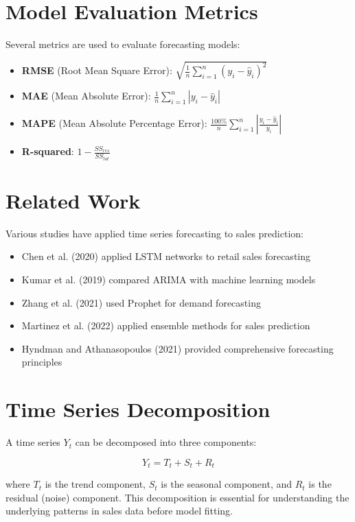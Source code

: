 \documentclass[12pt,a4paper]{report}
\begin{document}
\section{Model Evaluation Metrics}
\label{sec:metrics}
Several metrics are used to evaluate forecasting models:

\begin{itemize}
    \item \textbf{RMSE} (Root Mean Square Error): $\sqrt{\frac{1}{n}\sum_{i=1}^{n}(y_i - \hat{y}_i)^2}$
    \item \textbf{MAE} (Mean Absolute Error): $\frac{1}{n}\sum_{i=1}^{n}|y_i - \hat{y}_i|$
    \item \textbf{MAPE} (Mean Absolute Percentage Error): $\frac{100\%}{n}\sum_{i=1}^{n}|\frac{y_i - \hat{y}_i}{y_i}|$
    \item \textbf{R-squared}: $1 - \frac{SS_{res}}{SS_{tot}}$
\end{itemize}

\section{Related Work}
\label{sec:related}
Various studies have applied time series forecasting to sales prediction:

\begin{itemize}
    \item Chen et al. (2020) applied LSTM networks to retail sales forecasting
    \item Kumar et al. (2019) compared ARIMA with machine learning models
    \item Zhang et al. (2021) used Prophet for demand forecasting
    \item Martinez et al. (2022) applied ensemble methods for sales prediction
    \item Hyndman and Athanasopoulos (2021) provided comprehensive forecasting principles
\end{itemize}

\section{Time Series Decomposition}
\label{sec:decomposition}
A time series $Y_t$ can be decomposed into three components:

\begin{equation}
Y_t = T_t + S_t + R_t
\end{equation}

where $T_t$ is the trend component, $S_t$ is the seasonal component, and $R_t$ is the residual (noise) component. This decomposition is essential for understanding the underlying patterns in sales data before model fitting.
\end{document}

